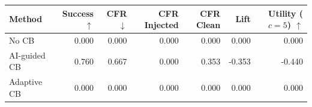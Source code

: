 \begin{tabular}{lrrrrrr}
\toprule
Method & Success $\uparrow$ & CFR $\downarrow$ & CFR Injected & CFR Clean & Lift & Utility ($c=5$) $\uparrow$ \\
\midrule
No CB & 0.000 & 0.000 & 0.000 & 0.000 & 0.000 & 0.000 \\
AI-guided CB & 0.760 & 0.667 & 0.000 & 0.353 & -0.353 & -0.440 \\
Adaptive CB & 0.000 & 0.000 & 0.000 & 0.000 & 0.000 & 0.000 \\
\bottomrule
\end{tabular}

